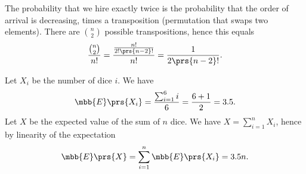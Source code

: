 \documentclass[oneside]{scrbook}
\theoremstyle{definition}
\begin{document}
\begin{exercise}
The probability that we hire exactly twice is the probability that the order of arrival is decreasing, times a transposition (permutation that swaps two elements).
There are $\binom{n}{2}$ possible transpositions, hence this equals \[\frac{\binom{n}{2}}{n!} = \frac{\frac{n!}{2! \prs{n-2}!}}{n!} = \frac{1}{2 \prs{n-2}!} \text{.}\]
\end{exercise}

\begin{exercise}
Let $X_i$ be the number of dice $i$. We have
\begin{align*}
\mbb{E}\prs{X_i} = \frac{\sum_{i=1}^6 i}{6} = \frac{6+1}{2} = 3.5 \text{.}
\end{align*}
Let $X$ be the expected value of the sum of $n$ dice. We have $X = \sum_{i=1}^n X_i$, hence by linearity of the expectation
\begin{align*}
\mbb{E}\prs{X} = \sum_{i=1}^n \mbb{E}\prs{X_i} = 3.5 n \text{.}
\end{align*}
\end{exercise}
\end{document}
